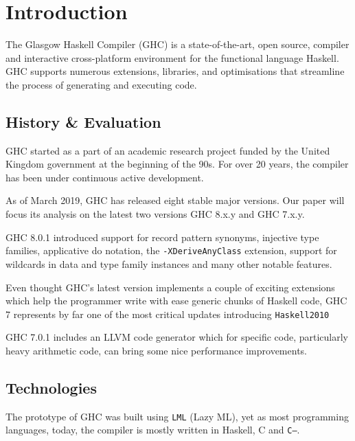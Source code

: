 \section{Introduction}

The Glasgow Haskell Compiler (GHC) is a state-of-the-art, open source, compiler and interactive cross-platform environment for the functional language Haskell. GHC supports numerous extensions, libraries, and optimisations that streamline the process of generating and executing code.


\subsection{History \& Evaluation}

GHC started as a part of an academic research project funded by the United Kingdom government at the beginning of the 90s. For over 20 years, the compiler has been under continuous active development.

As of March 2019, GHC has released eight stable major versions. Our paper will focus its analysis on the latest two versions GHC 8.x.y and GHC 7.x.y. 

GHC 8.0.1 introduced support for record pattern synonyms, injective type families, applicative do notation, the \texttt{-XDeriveAnyClass} extension, support for wildcards in data and type family instances and many other notable features.

Even thought GHC's latest version implements a couple of exciting extensions which help the programmer write with ease generic chunks of Haskell code, GHC 7 represents by far one of the most critical updates introducing \texttt{Haskell2010}

GHC 7.0.1 includes an LLVM code generator which for specific code, particularly heavy arithmetic code, can bring some nice performance improvements.

\subsection{Technologies}

The prototype of GHC was built using \texttt{LML} (Lazy ML), yet as most programming languages, today, the compiler is mostly written in Haskell, C and \texttt{C--}.